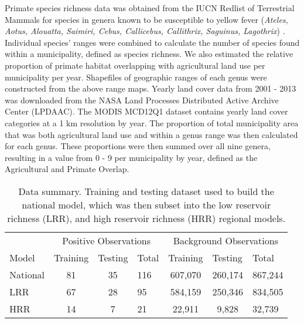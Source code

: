 \documentclass{article}
\begin{document}
Primate species richness data was obtained from the IUCN Redlist of Terrestrial Mammals for species in genera known to be susceptible to yellow fever (\textit{Ateles, Aotus, Alouatta, Saimiri, Cebus, Callicebus, Callithrix, Saguinus, Lagothrix}) \cite{bicca-marques2010,hamrick2017}. Individual species' ranges were combined to calculate the number of species found within a municipality, defined as species richness. We also estimated the relative proportion of primate habitat overlapping with agricultural land use per municipality per year. Shapefiles of geographic ranges of each genus were constructed from the above range maps. Yearly land cover data from 2001 - 2013 was downloaded from the NASA Land Processes Distributed Active Archive Center (LPDAAC). The MODIS MCD12Q1 dataset contains yearly land cover categories at a 1 km resolution by year. The proportion of total municipality area that was both agricultural land use and within a genus range was then calculated for each genus.  These proportions were then summed over all nine genera, resulting in a value from 0 - 9 per municipality by year, defined as the Agricultural and Primate Overlap.



\clearpage

\begin{table}[h]
\normalsize
\centering
\caption{Data summary. Training and testing dataset used to build the national model, which was then subset into the low reservoir richness (LRR), and high reservoir richness (HRR) regional models. }
\label{my-label}
\begin{tabular}{lcclccl}
      & \multicolumn{3}{c}{Positive Observations}                          & \multicolumn{3}{c}{Background Observations}                          \\ \cline{2-7}
Model & \multicolumn{1}{l}{Training} & \multicolumn{1}{l}{Testing} & Total & \multicolumn{1}{l}{Training} & \multicolumn{1}{l}{Testing} & Total   \\ \hline
National   & 81                           & 35                          & 116   & 607,070                      & 260,174                     & 867,244 \\
LRR   & 67                           & 28                          & 95    & 584,159                      & 250,346                     & 834,505 \\
HRR   & 14                           & 7                           & 21    & 22,911                       & 9,828                       & 32,739
\end{tabular}
%
\end{table}
\end{document}
